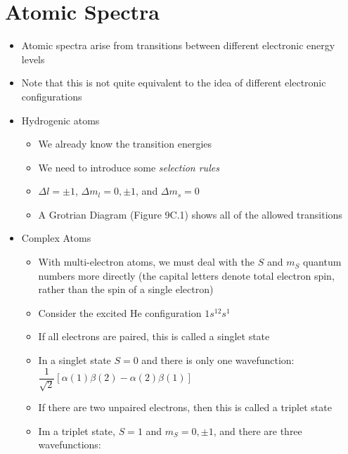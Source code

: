 \documentclass[12pt, openany, letterpaper]{memoir}
\begin{document}
\section{Atomic Spectra}
\begin{itemize}
	\item Atomic spectra arise from transitions between different electronic energy levels
	\item Note that this is not quite equivalent to the idea of different electronic configurations
	\item Hydrogenic atoms
	\begin{itemize}
		\item We already know the transition energies
		\item We need to introduce some \emph{selection rules}
		\item $\Delta l = \pm 1$, $\Delta m_l = 0, \pm 1$, and $\Delta m_s = 0$
		\item A Grotrian Diagram (Figure 9C.1) shows all of the allowed transitions
	\end{itemize}
	\item Complex Atoms
	\begin{itemize}
		\item With multi-electron atoms, we must deal with the $S$ and $m_S$ quantum numbers more directly (the capital letters denote total electron spin, rather than the spin of a single electron)
		\item Consider the excited He configuration $1s^12s^1$
		\item If all electrons are paired, this is called a singlet state
		\item In a singlet state $S=0$ and there is only one wavefunction: $\dfrac{1}{\sqrt{2}}\left[\alpha(1)\beta(2) - \alpha(2)\beta(1)\right]$
		\item If there are two unpaired electrons, then this is called a triplet state
		\item Im a triplet state, $S=1$ and $m_S = 0, \pm 1$, and there are three wavefunctions:
		

\end{itemize}
\end{itemize}
\end{document}
